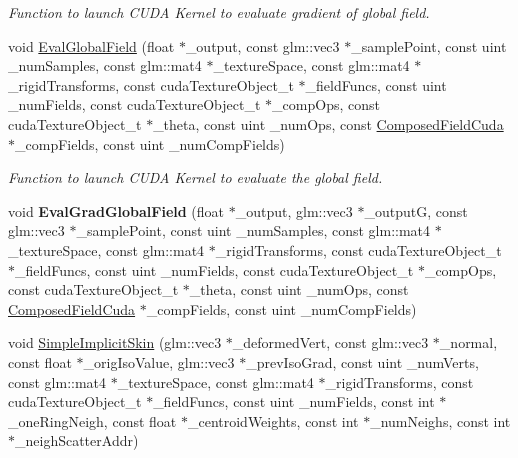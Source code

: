 \begin{DoxyCompactItemize}
\begin{DoxyCompactList}\small\item\em Function to launch C\+U\+DA Kernel to evaluate gradient of global field. \end{DoxyCompactList}\item 
void \hyperlink{namespaceisgw_a604bf029583becf2202af2d10f70f6a0}{Eval\+Global\+Field} (float $\ast$\+\_\+output, const glm\+::vec3 $\ast$\+\_\+sample\+Point, const uint \+\_\+num\+Samples, const glm\+::mat4 $\ast$\+\_\+texture\+Space, const glm\+::mat4 $\ast$\+\_\+rigid\+Transforms, const cuda\+Texture\+Object\+\_\+t $\ast$\+\_\+field\+Funcs, const uint \+\_\+num\+Fields, const cuda\+Texture\+Object\+\_\+t $\ast$\+\_\+comp\+Ops, const cuda\+Texture\+Object\+\_\+t $\ast$\+\_\+theta, const uint \+\_\+num\+Ops, const \hyperlink{classComposedFieldCuda}{Composed\+Field\+Cuda} $\ast$\+\_\+comp\+Fields, const uint \+\_\+num\+Comp\+Fields)\hypertarget{namespaceisgw_a604bf029583becf2202af2d10f70f6a0}{}\label{namespaceisgw_a604bf029583becf2202af2d10f70f6a0}

\begin{DoxyCompactList}\small\item\em Function to launch C\+U\+DA Kernel to evaluate the global field. \end{DoxyCompactList}\item 
void {\bfseries Eval\+Grad\+Global\+Field} (float $\ast$\+\_\+output, glm\+::vec3 $\ast$\+\_\+outputG, const glm\+::vec3 $\ast$\+\_\+sample\+Point, const uint \+\_\+num\+Samples, const glm\+::mat4 $\ast$\+\_\+texture\+Space, const glm\+::mat4 $\ast$\+\_\+rigid\+Transforms, const cuda\+Texture\+Object\+\_\+t $\ast$\+\_\+field\+Funcs, const uint \+\_\+num\+Fields, const cuda\+Texture\+Object\+\_\+t $\ast$\+\_\+comp\+Ops, const cuda\+Texture\+Object\+\_\+t $\ast$\+\_\+theta, const uint \+\_\+num\+Ops, const \hyperlink{classComposedFieldCuda}{Composed\+Field\+Cuda} $\ast$\+\_\+comp\+Fields, const uint \+\_\+num\+Comp\+Fields)\hypertarget{namespaceisgw_acd335360a97886a51e3a34ba242ae4e2}{}\label{namespaceisgw_acd335360a97886a51e3a34ba242ae4e2}

\item 
void \hyperlink{namespaceisgw_a2949156312b4162caa9551f1213bf131}{Simple\+Implicit\+Skin} (glm\+::vec3 $\ast$\+\_\+deformed\+Vert, const glm\+::vec3 $\ast$\+\_\+normal, const float $\ast$\+\_\+orig\+Iso\+Value, glm\+::vec3 $\ast$\+\_\+prev\+Iso\+Grad, const uint \+\_\+num\+Verts, const glm\+::mat4 $\ast$\+\_\+texture\+Space, const glm\+::mat4 $\ast$\+\_\+rigid\+Transforms, const cuda\+Texture\+Object\+\_\+t $\ast$\+\_\+field\+Funcs, const uint \+\_\+num\+Fields, const int $\ast$\+\_\+one\+Ring\+Neigh, const float $\ast$\+\_\+centroid\+Weights, const int $\ast$\+\_\+num\+Neighs, const int $\ast$\+\_\+neigh\+Scatter\+Addr)\hypertarget{namespaceisgw_a2949156312b4162caa9551f1213bf131}{}\label{namespaceisgw_a2949156312b4162caa9551f1213bf131}


\end{DoxyCompactItemize}
